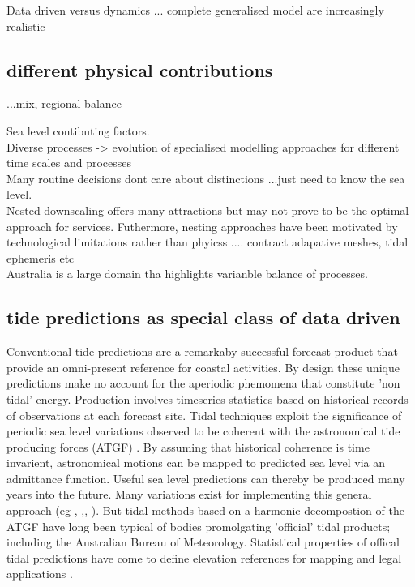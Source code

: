 \documentclass[jmse,article,submit,moreauthors,pdftex,10pt,a4paper]{mdpi}
\begin{document}
Data driven versus dynamics ...
complete generalised model are increasingly realistic\\
% 

\subsection{different physical contributions}
 ...mix, regional balance






Sea level contibuting factors.\\
Diverse processes -> evolution of specialised modelling approaches for different time scales and processes\\
Many routine decisions dont care about distinctions ...just need to know the sea level.\\
Nested downscaling offers many attractions but may not prove to be the optimal approach for services.  Futhermore, nesting approaches have been motivated by technological limitations rather than phyicss .... contract adapative meshes, tidal ephemeris etc\\

Australia is a large domain tha highlights varianble balance of processes.\\


\subsection{tide predictions as special class of data driven}

Conventional tide predictions are a remarkaby successful forecast product that provide an omni-present reference for coastal activities.
By design these unique predictions make no account for the aperiodic phemomena that constitute 'non tidal' energy. 
Production involves timeseries statistics based on historical records of observations at each forecast site.
Tidal techniques exploit the significance of periodic sea level variations observed to be coherent with the astronomical tide producing forces (ATGF) \cite{Hendershott:1981ub}.     
By assuming that historical coherence is time invarient, astronomical motions can be mapped to predicted sea level via an admittance function.   
Useful sea level predictions can thereby be produced many years into the future.  
Many variations exist for implementing this general approach (eg \cite{Foreman:2009bg}, \cite{Groves:1975ky},\cite{LEFFLER:2009ej},\cite{Smith:1997ut} ). 
But tidal methods based on a harmonic decompostion of the ATGF have long been typical of bodies promolgating 'official' tidal products; including the Australian Bureau of Meteorology.
Statistical properties of offical tidal predictions have come to define elevation references for mapping and legal applications \cite{PCTMSL:2009vy}.
\end{document}
